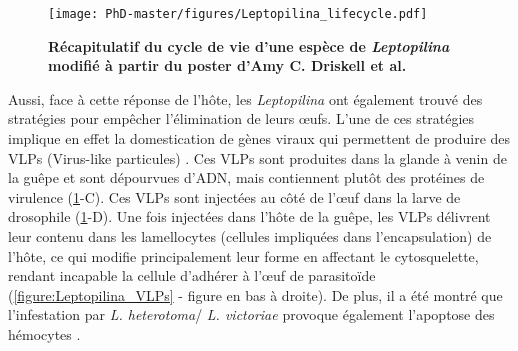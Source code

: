 \begin{figure}[!htpbt]
\captionsetup{font=footnotesize}
 \centering
  \texttt{[image: PhD-master/figures/Leptopilina\_lifecycle.pdf]}
\caption[Intro:Récapitulatif du cycle de vie d'une espèce de \textit{Leptopilina}]{\textbf{Récapitulatif du cycle de vie d'une espèce de \textit{Leptopilina} modifié à partir du poster d'Amy C. Driskell et al.}}
\label{figure:Leptopilina_lifecycle}
\end{figure}


Aussi, face à cette réponse de l'hôte, les \textit{Leptopilina} ont également trouvé des stratégies pour empêcher l'élimination de leurs œufs. L'une de ces stratégies implique en effet la domestication de gènes viraux qui permettent de produire des VLPs (Virus-like particules) \citep{rizki_parasitoid_1990}. Ces VLPs sont produites dans la glande à venin de la guêpe et sont dépourvues d'ADN, mais contiennent plutôt des protéines de virulence (\figurename{\ref{figure:Leptopilina_lifecycle}}-C). Ces VLPs sont injectées au côté de l'œuf dans la larve de drosophile \citep{colinet_convergent_2007} (\figurename{\ref{figure:Leptopilina_lifecycle}}-D). Une fois injectées dans l'hôte de la guêpe, les VLPs délivrent leur contenu dans les lamellocytes (cellules impliquées dans l'encapsulation) de l'hôte, ce qui modifie principalement leur forme en affectant le cytosquelette, rendant incapable la cellule d'adhérer à l'œuf de parasitoïde \citep{rizki_parasitoid_1990, colinet_convergent_2007} (\figurename{\ref{figure:Leptopilina_VLPs}} - figure en bas à droite). De plus, il a été montré que l'infestation par \textit{L. heterotoma}/ \textit{L. victoriae} provoque également l'apoptose des hémocytes \citep{chiu_natural_2002}.



